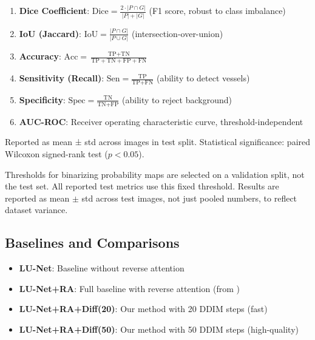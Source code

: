 \documentclass[11pt]{article}
\begin{document}
\begin{enumerate}
    \item \textbf{Dice Coefficient}: $\text{Dice} = \frac{2 \cdot |P \cap G|}{|P| + |G|}$ (F1 score, robust to class imbalance)
    
    \item \textbf{IoU (Jaccard)}: $\text{IoU} = \frac{|P \cap G|}{|P \cup G|}$ (intersection-over-union)
    
    \item \textbf{Accuracy}: $\text{Acc} = \frac{\text{TP} + \text{TN}}{\text{TP} + \text{TN} + \text{FP} + \text{FN}}$
    
    \item \textbf{Sensitivity (Recall)}: $\text{Sen} = \frac{\text{TP}}{\text{TP} + \text{FN}}$ (ability to detect vessels)
    
    \item \textbf{Specificity}: $\text{Spec} = \frac{\text{TN}}{\text{TN} + \text{FP}}$ (ability to reject background)
    
    \item \textbf{AUC-ROC}: Receiver operating characteristic curve, threshold-independent
\end{enumerate}

Reported as mean ± std across images in test split. Statistical significance: paired Wilcoxon signed-rank test ($p < 0.05$).

Thresholds for binarizing probability maps are selected on a validation split, not the test set. All reported test metrics use this fixed threshold. Results are reported as mean $\pm$ std across test images, not just pooled numbers, to reflect dataset variance.

\subsection{Baselines and Comparisons}

\begin{itemize}
    \item \textbf{LU-Net}: Baseline without reverse attention
    \item \textbf{LU-Net+RA}: Full baseline with reverse attention (from \cite{LU2023})
    \item \textbf{LU-Net+RA+Diff(20)}: Our method with 20 DDIM steps (fast)
    \item \textbf{LU-Net+RA+Diff(50)}: Our method with 50 DDIM steps (high-quality)
\end{itemize}
\end{document}
